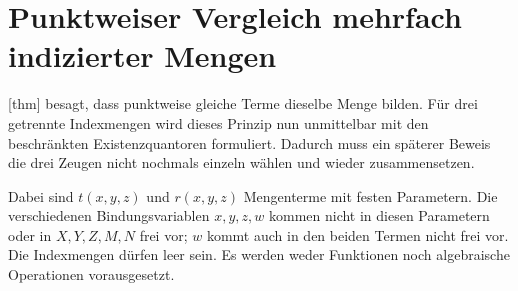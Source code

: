 \section{Punktweiser Vergleich mehrfach indizierter Mengen}

[thm] besagt, dass
punktweise gleiche Terme dieselbe Menge bilden. Für drei getrennte
Indexmengen wird dieses Prinzip nun unmittelbar mit den beschränkten
Existenzquantoren formuliert. Dadurch muss ein späterer Beweis die drei
Zeugen nicht nochmals einzeln wählen und wieder zusammensetzen.

Dabei sind \(t(x,y,z)\) und \(r(x,y,z)\) Mengenterme mit festen
Parametern. Die verschiedenen Bindungsvariablen \(x,y,z,w\) kommen
nicht in diesen Parametern oder in \(X,Y,Z,M,N\) frei vor; \(w\)
kommt auch in den beiden Termen nicht frei vor. Die Indexmengen dürfen
leer sein. Es werden weder Funktionen noch algebraische Operationen
vorausgesetzt.

